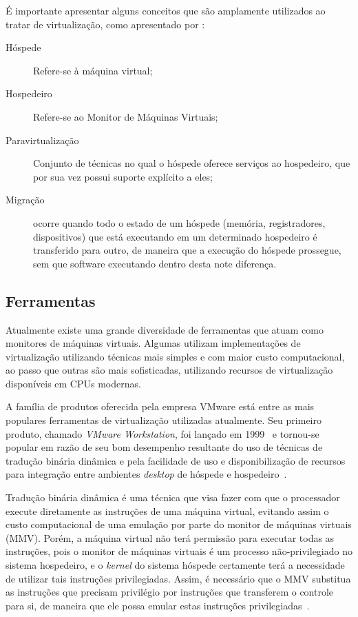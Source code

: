 

É importante apresentar alguns conceitos que são amplamente utilizados ao
tratar de virtualização, como apresentado por
:
\begin{description}
  \item[Hóspede] Refere-se à máquina virtual;
  \item[Hospedeiro] Refere-se ao Monitor de Máquinas Virtuais;
  \item[Paravirtualização] Conjunto de técnicas no qual o hóspede oferece
        serviços ao hospedeiro, que por sua vez possui suporte explícito a
        eles;
  \item[Migração] ocorre quando todo o estado de um hóspede
       (memória, registradores, dispositivos) que está executando em um
       determinado hospedeiro é transferido para outro, de maneira que a
       execução do hóspede prossegue, sem que software executando dentro
       desta note diferença.
\end{description}

\subsection{Ferramentas}

Atualmente existe uma grande diversidade de ferramentas que atuam como
monitores de máquinas virtuais. Algumas utilizam implementações de
virtualização utilizando técnicas mais simples e com maior custo
computacional, ao passo que outras são mais sofisticadas, utilizando
recursos de virtualização disponíveis em CPUs modernas.


A família de produtos oferecida pela empresa VMware está entre as mais
populares ferramentas de virtualização utilizadas atualmente. Seu primeiro
produto, chamado \emph{VMware Workstation}, foi lançado em
1999~\cite{vmwareMilestones} e tornou-se popular em razão de seu bom
desempenho resultante do uso de técnicas de tradução binária dinâmica e
pela facilidade de uso e disponibilização de recursos para integração entre
ambientes \emph{desktop} de hóspede e hospedeiro~\cite{nieh2000examining}.

Tradução binária dinâmica é uma técnica que visa fazer com que o processador
execute diretamente as instruções de uma máquina virtual, evitando assim o
custo computacional de uma emulação por parte do monitor de máquinas
virtuais (MMV). Porém, a máquina virtual não terá permissão para executar
todas as instruções, pois o monitor de máquinas virtuais é um processo
não-privilegiado no sistema hospedeiro, e o \emph{kernel} do sistema
hóspede certamente terá a necessidade de utilizar tais instruções
privilegiadas. Assim, é necessário que o MMV substitua as instruções que
precisam privilégio por instruções que transferem o controle para si, de
maneira que ele possa emular estas instruções
privilegiadas~\cite{ung2000machine}.

